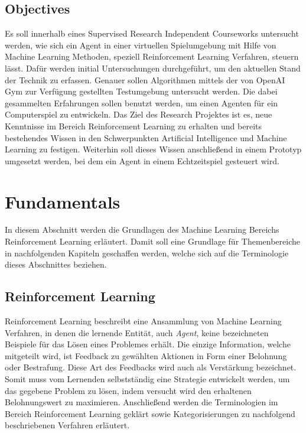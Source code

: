 \documentclass[11pt]{scrartcl}
\begin{document}
\subsection{Objectives}
Es soll innerhalb eines Supervised Research Independent Courseworks untersucht werden, wie
sich ein Agent in einer virtuellen Spielumgebung mit Hilfe von Machine Learning Methoden,
speziell Reinforcement Learning Verfahren, steuern lässt. Dafür werden initial
Untersuchungen durchgeführt, um den aktuellen Stand der Technik zu erfassen. Genauer
sollen Algorithmen mittels der von OpenAI Gym zur Verfügung gestellten Testumgebung
untersucht werden. Die dabei gesammelten Erfahrungen sollen benutzt werden, um einen
Agenten für ein Computerspiel zu entwickeln. Das Ziel des Research Projektes ist es, neue
Kenntnisse im Bereich Reinforcement Learning zu erhalten und bereits bestehendes Wissen in
den Schwerpunkten Artificial Intelligence und Machine Learning zu festigen. Weiterhin soll
dieses Wissen anschließend in einem Prototyp umgesetzt werden, bei dem ein Agent in einem
Echtzeitspiel gesteuert wird.

\newpage
\section{Fundamentals}
In diesem Abschnitt werden die Grundlagen des Machine Learning Bereichs Reinforcement Learning 
erläutert. Damit soll eine Grundlage für Themenbereiche in nachfolgenden Kapiteln geschaffen
werden, welche sich auf die Terminologie dieses Abschnittes beziehen.

\subsection{Reinforcement Learning}
Reinforcement Learning beschreibt eine Ansammlung von Machine Learning Verfahren, in denen die 
lernende Entität, auch \textit{Agent}, keine bezeichneten Beispiele für das Lösen eines Problemes 
erhält. Die einzige Information, welche mitgeteilt wird, ist Feedback zu gewählten Aktionen in Form
einer Belohnung oder Bestrafung. Diese Art des Feedbacks wird auch als Verstärkung bezeichnet.
Somit muss vom Lernenden selbstständig eine Strategie entwickelt werden, um das gegebene
Problem zu lösen, indem versucht wird den erhaltenen Belohnungswert zu maximieren. Anschließend
werden die Terminologien im Bereich Reinforcement Learning geklärt sowie Kategorisierungen zu 
nachfolgend beschriebenen Verfahren erläutert.
\end{document}
